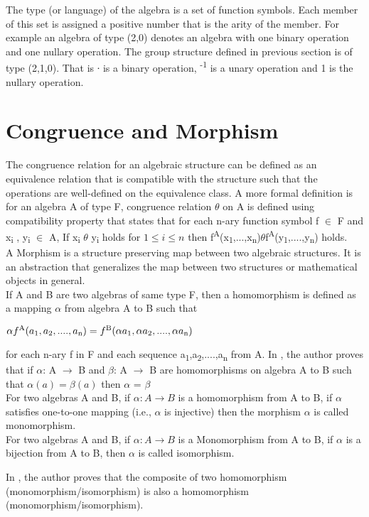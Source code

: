 The type (or language) of the algebra is a set of function symbols. Each member
of this set is assigned a positive number that is the arity of the member. For
example an algebra of type (2,0) denotes an algebra with one binary operation
and one nullary operation. The group structure defined in previous section is of
type (2,1,0). That is ∙ is a binary operation, \textsuperscript{-1} is a unary
operation and 1 is the nullary operation. \\

\section{Congruence and Morphism}
The congruence relation for an algebraic structure can be defined as an
equivalence relation that is compatible with the structure such that the
operations are well-defined on the equivalence class. A more formal definition
is for an algebra A of type F, congruence relation \(\theta\) on A is defined
using compatibility property that states that for each n-ary function symbol f
\(\in\) F and x\textsubscript{i} , y\textsubscript{i} \(\in\) A, If
x\textsubscript{i} \(\theta\) y\textsubscript{i}  holds for \(1\leq i \leq n\)
then
f\textsuperscript{A}(x\textsubscript{1},...,x\textsubscript{n})\(\theta\)f\textsuperscript{A}(y\textsubscript{1},....,y\textsubscript{n})
holds\cite{sankappanavar1981course}.\\

A Morphism is a structure preserving map between two algebraic structures. It is
an abstraction that generalizes the map between two structures or mathematical
objects in general. \\
If A and B are two algebras of same type F, then a homomorphism is defined as a
mapping \(\alpha\) from algebra A to B such that
\begin{center}
\(\alpha
f\textsuperscript{A}(a\textsubscript{1},a\textsubscript{2},....,a\textsubscript{n})
= f\textsuperscript{B}(\alpha a\textsubscript{1},\alpha
a\textsubscript{2},....,\alpha a\textsubscript{n})\)\\
\end{center}
for each n-ary f in F and each sequence
a\textsubscript{1},a\textsubscript{2},....,a\textsubscript{n} from A. In
\cite{sankappanavar1981course}, the author proves that if \(\alpha\): A
\(\rightarrow\) B and \(\beta\): A \(\rightarrow\) B are homomorphisms on
algebra A to B such that \(\alpha (a) = \beta (a) \) then \(\alpha\) = \(\beta\)
\\

For two algebras A and B, if \(\alpha : A \rightarrow B \)  is a homomorphism
from A to B, if \(\alpha\) satisfies one-to-one mapping (i.e., \(\alpha\) is
injective) then the morphism \(\alpha\) is called monomorphism. \\

For two algebras A and B, if \(\alpha : A \rightarrow B \)  is a Monomorphism
from A to B, if \(\alpha\) is a bijection from A to B, then \(\alpha\) is called
isomorphism.

In \cite{sankappanavar1981course}, the author proves that the composite of two
homomorphism (monomorphism/isomorphism) is also a homomorphism
(monomorphism/isomorphism).
